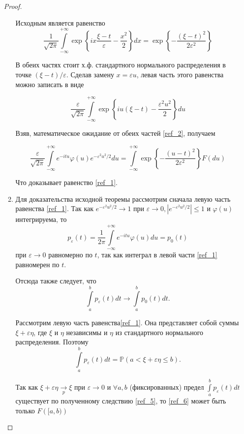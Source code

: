 \documentclass[a4paper,12pt]{article}
\newcommand{\lt}{\left}
\newcommand{\rt}{\right}
\newcommand{\fr}{\frac}
\newcommand{\bb}{\mathbb}
\newcommand{\ve}{\varepsilon}
\newcommand{\vp}{\varphi}
\begin{document}
\begin{enumerate}
\begin{proof}
\begin{enumerate}
	Исходным является равенство
	\begin{equation}\label{ref_2}
	\fr{1}{\sqrt{2\pi}}\int\limits_{-\infty}^{+\infty}\exp\lt\{ix\fr{\xi - t}{\ve}  - \fr{x^2}{2}\rt\}dx = \exp\lt\{-\fr{(\xi - t)^2}{2\ve^2} \rt\}
	\end{equation}
	
	В обеих частях стоит х.ф. стандартного нормального распределения в точке $(\xi - t)/\ve$. Сделав замену $x = \ve u$, левая часть этого равенства можно записать в виде 
	
	$$\fr{\ve}{\sqrt{2\pi}}\int\limits_{-\infty}^{+\infty}\exp\lt\{iu (\xi - t)  - \fr{\ve^2u^2}{2}\rt\}du$$
	
	Взяв, математическое ожидание от обеих частей \eqref{ref_2}, получаем
	
	$$\fr{\ve}{\sqrt{2\pi}}\int\limits_{-\infty}^{+\infty}e^{-itu}\vp(u)e^{-\ve^2u^2/2}du = \int\limits_{-\infty}^{+\infty}\exp\lt\{-\fr{(u - t)^2}{2\ve^2} \rt\}F(du)$$
	
	Что доказывает равенство \eqref{ref_1}.
	
	\item Для доказательства исходной теоремы рассмотрим сначала левую часть равенства \eqref{ref_1}. Так как $e^{-\ve^2u^2/2}\rightarrow 1$ при $\ve \rightarrow 0, |e^{-\ve^2u^2/2}|\le 1$ и $\vp(u)$ интегрируема, то 
	\begin{equation}\label{ref_4}
	p_{\ve}(t) = \fr{1}{2\pi}\int\limits_{-\infty}^{+\infty}e^{-itu}\vp(u)du = p_0(t)
	\end{equation}
	при $\ve \rightarrow 0$ равномерно по $t$, так как интеграл в левой части \eqref{ref_1} равномерен по $t$. 
	
	Отсюда также следует, что 
	\begin{equation}\label{ref_5}
	\int\limits_{a}^{b} p_{\ve}(t)dt \rightarrow \int\limits_{a}^{b} p_{0}(t)dt.
	\end{equation}
	
	Рассмотрим левую часть равенства\eqref{ref_1}. Она представляет собой суммы $\xi + \ve \eta$, где $\xi$ и $\eta$ независимы и $\eta$ из стандартного нормального распределения. Поэтому
	\begin{equation}\label{ref_6}
	\int\limits_{a}^{b} p_{\ve}(t)dt = \bb P (a < \xi + \ve\eta\le b).
	\end{equation}
	
	Так как $\xi + \ve\eta \xrightarrow[p]{} \xi$ при $\ve \rightarrow 0$ и $\forall a, b$ (фиксированных) предел $\int\limits_{a}^{b} p_{\ve}(t)dt$ существует по полученному следствию \eqref{ref_5}, то  \eqref{ref_6} может быть только $F\lt([a, b)\rt)$
	

\end{enumerate}
\end{proof}
\end{enumerate}
\end{document}

